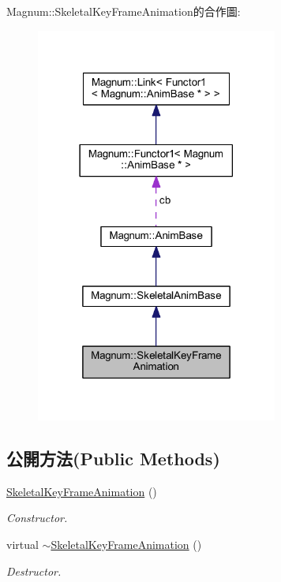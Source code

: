 Magnum\+:\+:Skeletal\+Key\+Frame\+Animation的合作圖\+:\nopagebreak
\begin{figure}[H]
\begin{center}
\leavevmode
\includegraphics[width=225pt]{class_magnum_1_1_skeletal_key_frame_animation__coll__graph}
\end{center}
\end{figure}
\subsection*{公開方法(Public Methods)}
\begin{DoxyCompactItemize}
\item 
\hyperlink{class_magnum_1_1_skeletal_key_frame_animation_a5aa852bbada029ee5a388e57433fd5e8}{Skeletal\+Key\+Frame\+Animation} ()\hypertarget{class_magnum_1_1_skeletal_key_frame_animation_a5aa852bbada029ee5a388e57433fd5e8}{}\label{class_magnum_1_1_skeletal_key_frame_animation_a5aa852bbada029ee5a388e57433fd5e8}

\begin{DoxyCompactList}\small\item\em Constructor. \end{DoxyCompactList}\item 
virtual \hyperlink{class_magnum_1_1_skeletal_key_frame_animation_a1751240220c232baa7b78609acf622a3}{$\sim$\+Skeletal\+Key\+Frame\+Animation} ()\hypertarget{class_magnum_1_1_skeletal_key_frame_animation_a1751240220c232baa7b78609acf622a3}{}\label{class_magnum_1_1_skeletal_key_frame_animation_a1751240220c232baa7b78609acf622a3}

\begin{DoxyCompactList}\small\item\em Destructor. \end{DoxyCompactList}\end{DoxyCompactItemize}
